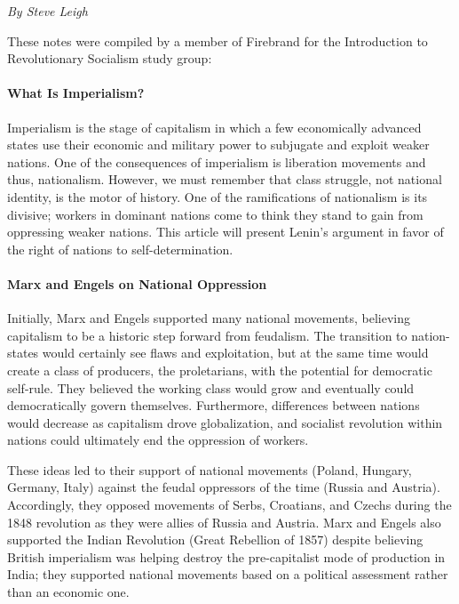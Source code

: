 \emph{By Steve Leigh}

These notes were compiled by a member of Firebrand for the Introduction to Revolutionary Socialism study group:

\paragraph{What Is Imperialism?}

Imperialism is the stage of capitalism in which a few economically advanced states use their economic and military power to subjugate and exploit weaker nations. One of the consequences of imperialism is liberation movements and thus, nationalism. However, we must remember that class struggle, not national identity, is the motor of history. One of the ramifications of nationalism is its divisive; workers in dominant nations come to think they stand to gain from oppressing weaker nations. This article will present Lenin's argument in favor of the right of nations to self-determination.

\paragraph{Marx and Engels on National Oppression}

Initially, Marx and Engels supported many national movements, believing capitalism to be a historic step forward from feudalism. The transition to nation-states would certainly see flaws and exploitation, but at the same time would create a class of producers, the proletarians, with the potential for democratic self-rule. They believed the working class would grow and eventually could democratically govern themselves. Furthermore, differences between nations would decrease as capitalism drove globalization, and socialist revolution within nations could ultimately end the oppression of workers.

These ideas led to their support of national movements (Poland, Hungary, Germany, Italy) against the feudal oppressors of the time (Russia and Austria). Accordingly, they opposed movements of Serbs, Croatians, and Czechs during the 1848 revolution as they were allies of Russia and Austria. Marx and Engels also supported the Indian Revolution (Great Rebellion of 1857) despite believing British imperialism was helping destroy the pre-capitalist mode of production in India; they supported national movements based on a political assessment rather than an economic one.

